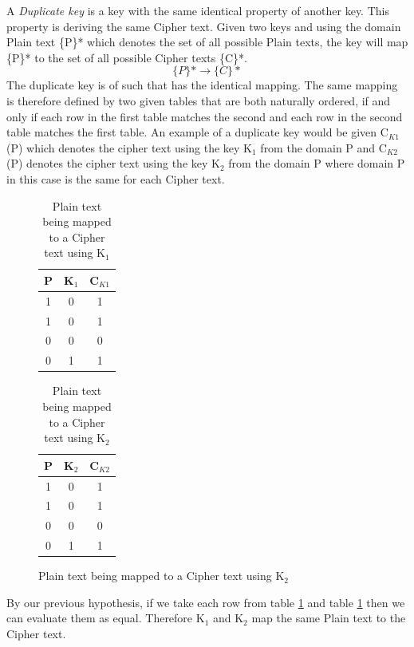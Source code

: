 \documentclass[11pt,a4paper]{report}
\begin{document}
 A \emph{Duplicate key} is a key with the same identical property of another key. This property is deriving the same Cipher text. Given two keys and using the domain Plain text \{P\}* which denotes the set of all possible Plain texts, the key will map \{P\}* to the set of all possible Cipher texts \{C\}*. 
 \begin{displaymath}
 \{P\}* \rightarrow \{C\}*
 \end{displaymath}
 The duplicate key is of such that has the identical mapping. The same mapping is therefore defined by two given tables that are both naturally ordered, if and only if each row in the first table matches the second and each row in the second table matches the first table.   
 An example of a duplicate key would be given C$_{K1}$(P) which denotes the cipher text using the key K$_1$ from the domain P and C$_{K2}$(P) denotes the cipher text using the key K$_2$ from the domain P where domain P in this case is the same for each Cipher text. 


\begin{figure}
\begin{table}[H]
\centering
\label{tab:C1}
\begin{tabular}{|c|c|c|} 
\hline
P & K$_1$ & C$_{K1}$ \\ \hline
1 & 0 & 1 \\ 
1 & 0 & 1 \\
0 & 0 & 0 \\
0 & 1 & 1 \\
\hline
\end{tabular}
\caption{Plain text being mapped to a Cipher text using K$_1$}
\end{table}

\begin{table}[H]
\centering
\label{tab:C2}
\begin{tabular}{|c|c|c|} 
\hline
P & K$_2$ & C$_{K2}$ \\ \hline
1 & 0 & 1 \\ 
1 & 0 & 1 \\
0 & 0 & 0 \\
0 & 1 & 1 \\
\hline
\end{tabular}
\caption{Plain text being mapped to a Cipher text using K$_2$}
\end{table}
\end{figure}

By our previous hypothesis, if we take each row from table \ref{tab:C1} and table \ref{tab:C2} then we can evaluate them as equal. Therefore K$_1$ and K$_2$ map the same Plain text to the Cipher text. 
\end{document}
